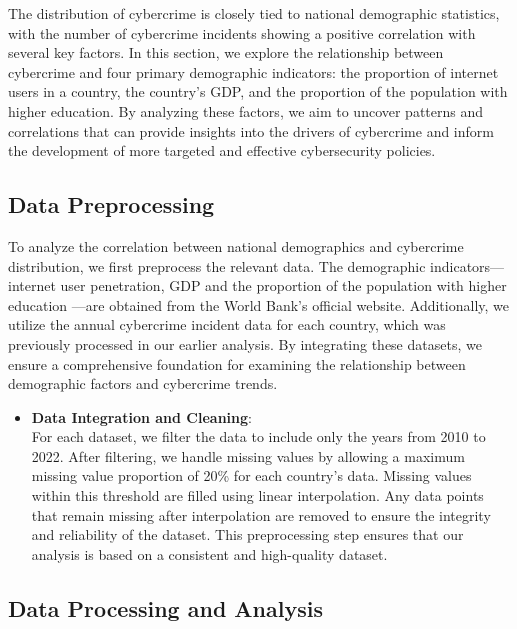 
The distribution of cybercrime is closely tied to national demographic statistics,
with the number of cybercrime incidents showing a positive correlation with several key factors.
In this section, we explore the relationship between cybercrime and four primary demographic indicators:
the proportion of internet users in a country,
the country's GDP, and the proportion of the population with higher education.
By analyzing these factors,
we aim to uncover patterns and correlations that can provide insights into the drivers of cybercrime
and inform the development of more targeted and effective cybersecurity policies.
\subsection{Data Preprocessing}\label{subsec:data-preprocessing} %
    To analyze the correlation between national demographics and cybercrime distribution,
    we first preprocess the relevant data.
    The demographic indicators—internet user penetration\cite{it-net-user-zs}, 
    GDP\cite{ny-gdp-mktp-cd} and 
    the proportion of the population with higher education\cite{se-ter-enrr}
    —are obtained from the World Bank's official website.
    Additionally, we utilize the annual cybercrime incident data for each country,
    which was previously processed in our earlier analysis.
    By integrating these datasets,
    we ensure a comprehensive foundation for examining the relationship between demographic factors and cybercrime trends.
    \begin{itemize}[label=\phantom{.}, leftmargin=-0.18em]
        \item \textbf{Data Integration and Cleaning}: \\
            For each dataset, we filter the data to include only the years from 2010 to 2022.
            After filtering,
            we handle missing values by allowing a maximum missing value proportion of 20\% for each country's data.
            Missing values within this threshold are filled using linear interpolation.
            Any data points that remain missing after interpolation
            are removed to ensure the integrity and reliability of the dataset.
            This preprocessing step ensures that our analysis is based on a consistent and high-quality dataset.
    \end{itemize}


\subsection{Data Processing and Analysis}\label{subsec:data-processing-and-analysis} %
